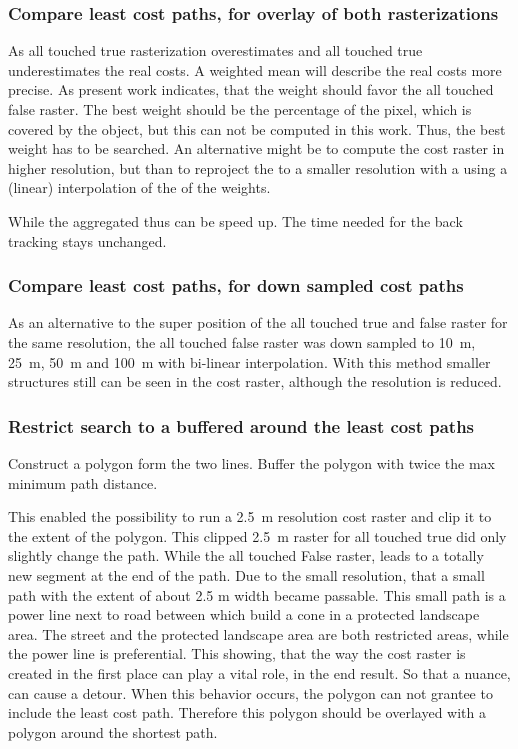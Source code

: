 \subsubsection{Compare least cost paths, for overlay of both rasterizations}
As all touched true rasterization overestimates and all touched true underestimates the real costs.
A weighted mean will describe the real costs more precise.
As present work indicates, that the weight should favor the all touched false raster.
The best weight should be the percentage of the pixel, which is covered by the object, but this can not be computed in this work.
Thus, the best weight has to be searched.
An alternative might be to compute the cost raster in higher resolution, but than to reproject the to a smaller resolution with a using a (linear) interpolation of the of the weights.

While the aggregated thus can be speed up.
The time needed for the back tracking stays unchanged.

\subsubsection{Compare least cost paths, for down sampled cost paths}
As an alternative to the super position of the all touched true and false raster for the same resolution, the all touched false raster was down sampled to 10~m, 25~m, 50~m and 100~m with bi-linear interpolation.
With this method smaller structures still can be seen in the cost raster, although the resolution is reduced.

\subsubsection{Restrict search to a buffered around the least cost paths}
Construct a polygon form the two lines.
Buffer the polygon with twice the max minimum path distance.


This enabled the possibility  to run a 2.5~m resolution cost raster and clip it to the extent of the polygon. 
This clipped 2.5~m raster for all touched true did only slightly change the path. 
While the all touched False raster, leads to a totally new segment at the end of the path. 
Due to the small resolution, that a small path with the extent of about 2.5 m width became passable. This small path is a power line next to road between which build a cone in a protected landscape area.
The street and the protected landscape area are both restricted areas, while the power line is preferential.
This showing, that the way the cost raster is created in the first place can play a vital role, in the end result. So that a nuance, can cause a detour.
When this behavior occurs, the polygon can not grantee to include the least cost path.
Therefore this polygon should be overlayed with a polygon around the shortest path.

